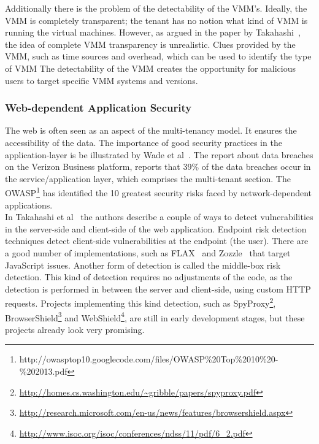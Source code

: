 Additionally there is the problem of the detectability of the \ac{VMM}’s. Ideally, the \ac{VMM} is completely transparent; the tenant has no notion what kind of \ac{VMM} is running the virtual machines. 
However, as argued in the paper by Takahashi~\cite{Takahashi2012Security}, the idea of complete \ac{VMM} transparency is unrealistic. 
Clues provided by the \ac{VMM}, such as time sources and overhead, which can be used to identify the type of \ac{VMM}
The detectability of the \ac{VMM} creates the opportunity for malicious users to target specific \ac{VMM} systems and versions.

\subsubsection{Web-dependent Application Security}
The web is often seen as an aspect of the multi-tenancy model. 
It ensures the accessibility of the data. 
The importance of good security practices in the application-layer is be illustrated by Wade et al~\cite{Wade2008Security}.
The report about data breaches on the Verizon Business platform, reports that 39\% of the data breaches occur in the service/application layer, which comprises the multi-tenant section. The \ac{OWASP}\footnote{http://owasptop10.googlecode.com/files/OWASP\%20Top\%2010\%20-\%202013.pdf} has identified the 10 greatest security risks faced by network-dependent applications.\\

In Takahashi et al~\cite{Takahashi2012Security} the authors describe a couple of ways to detect vulnerabilities in the server-side and client-side of the web application. 
Endpoint risk detection techniques detect client-side vulnerabilities at the endpoint (the user). 
There are a good number of implementations, such as FLAX~\cite{saxena10kudzu} and Zozzle~\cite{curtsinger2011zozzle} that target JavaScript issues. 
Another form of detection is called the middle-box risk detection. 
This kind of detection requires no adjustments of the code, as the detection is performed in between the server and client-side, using custom HTTP requests. 
Projects implementing this kind detection, such as SpyProxy\footnote{\url{http://homes.cs.washington.edu/~gribble/papers/spyproxy.pdf}}, BrowserShield\footnote{\url{http://research.microsoft.com/en-us/news/features/browsershield.aspx}} and WebShield\footnote{\url{http://www.isoc.org/isoc/conferences/ndss/11/pdf/6_2.pdf}}, are still in early development stages, but these projects already look very promising.

